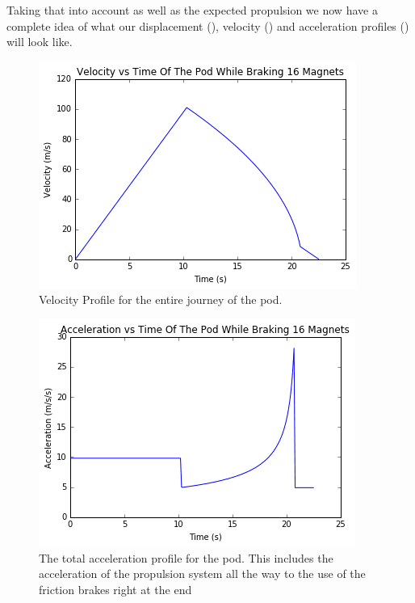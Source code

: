 \documentclass[main.tex]{subfiles}
\begin{document}
   Taking that into account as well as the expected propulsion we now have a complete idea of what our displacement (), velocity () and acceleration profiles () will look like.\\

    \begin{figure}
        \centering
        \includegraphics[width=\linewidth]{images/totalvelocityprofile}
        \caption{Velocity Profile for the entire journey of the pod.}
        \label{fig:total-velocity-profile}
    \end{figure}
    \begin{figure}
        \centering
        \includegraphics[width=\linewidth]{images/totalaccelerationprofile}
        \caption{The total acceleration profile for the pod. This includes the acceleration of the propulsion system all the way to the use of the friction brakes right at the end}
        \label{fig:total-acceleration-profile}
    \end{figure}
\end{document}
